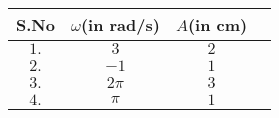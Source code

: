  \begin{tabular}{|c|c|c|c|}
        \hline
        \textbf{S.No} & \textbf{$\omega$(in rad/s)} &\textbf{$A$(in cm)}\\
        \hline
        $1.$ & $3$&$2$ \\
         \hline
        $2.$ & $-1$ &$1$\\
        \hline
        $3.$ & $2\pi$ & $3$\\
        \hline
        $4.$ & $\pi$ & $1$\\
        \hline
    \end{tabular}
 
